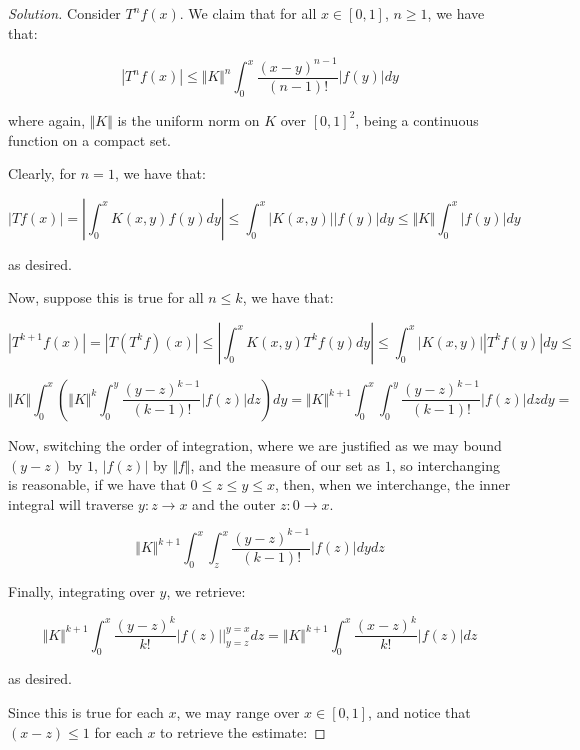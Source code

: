 \documentclass[10pt]{article}
\begin{document}
\begin{proof}[Solution]



Consider $T^n f (x)$. We claim that for all $x \in [0,1]$, $n \geq 1$, we have that:

$$ | T^n f(x) | \leq \Vert K \Vert^n \int_0^x \frac{ (x - y)^{n-1}}{(n-1)!} |f(y)| dy $$

where again, $\Vert K \Vert$ is the uniform norm on $K$ over $[0,1]^2$, being a continuous function on a compact set.

Clearly, for $n = 1$, we have that:

$$ | Tf(x) | = \left| \int_0^x K(x,y) f(y) dy \right| \leq \int_0^x |K(x,y)| |f(y)| dy \leq \Vert K \Vert \int_0^x |f(y)| dy$$

as desired.

Now, suppose this is true for all $n \leq k$, we have that:

$$ | T^{k+1} f(x)| = | T (T^k f)(x) | \leq \left| \int_0^x K(x,y) T^k f(y) dy \right| \leq \int_0^x | K(x,y) | |T^k f(y)| dy \leq $$

$$\Vert K \Vert \int_0^x \left( \Vert K \Vert^k \int_0^y \frac{ (y - z)^{k-1}}{(k-1)!} |f(z)| dz\right) dy = \Vert K \Vert^{k+1} \int_0^x \int_0^y   \frac{ (y - z)^{k-1}}{(k-1)!} |f(z)| dz dy = $$

Now, switching the order of integration, where we are justified as we may bound $(y-z)$ by $1$, $|f(z)|$ by $\Vert f \Vert$, and the measure of our set as $1$, so interchanging is reasonable, if we have that $0 \leq z \leq y \leq x$, then, when we interchange, the inner integral will traverse $y: z \to x$ and the outer $z: 0 \to x$.

$$  \Vert K \Vert^{k+1} \int_0^x \int_z^x   \frac{ (y - z)^{k-1}}{(k-1)!} |f(z)| dy dz $$

Finally, integrating over $y$, we retrieve:

$$ \Vert K \Vert^{k+1} \int_0^x  \frac{ (y - z)^{k}}{k!} |f(z)| \bigg|_{y=z}^{y=x} dz = \Vert K \Vert^{k+1} \int_0^x \frac{(x-z)^k}{k!} |f(z)|dz $$

as desired.

Since this is true for each $x$, we may range over $x \in [0,1]$, and notice that $(x - z) \leq 1$ for each $x$ to retrieve the estimate:


\end{proof}
\end{document}
